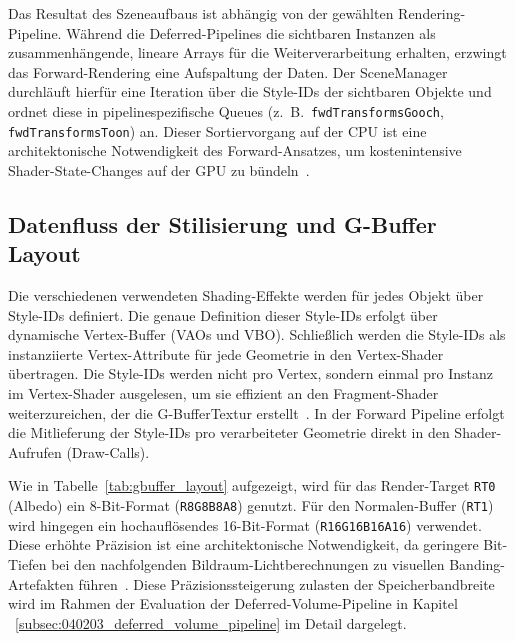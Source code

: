 Das Resultat des Szeneaufbaus ist abhängig von der gewählten Rendering-Pipeline.
Während die Deferred-Pipelines die sichtbaren Instanzen als zusammenhängende, lineare Arrays für die Weiterverarbeitung
erhalten, erzwingt das Forward-Rendering eine Aufspaltung der Daten.
Der SceneManager durchläuft hierfür eine Iteration über die Style-IDs der sichtbaren Objekte und ordnet diese in
pipelinespezifische Queues (z.\ B.\ \texttt{fwdTransformsGooch}, \texttt{fwdTransformsToon}) an.
Dieser Sortiervorgang auf der \ac{CPU} ist eine architektonische Notwendigkeit des Forward-Ansatzes, um
kostenintensive Shader-State-Changes auf der \ac{GPU} zu
bündeln~\parencite[vgl.][S.~795 u. S.~886]{akenine-mollerRealtimeRendering2019}.

\subsection{Datenfluss der Stilisierung und G-Buffer Layout}
\label{subsec:040103_g-buffer_layout}

Die verschiedenen verwendeten Shading-Effekte werden für jedes Objekt über Style-IDs definiert.
Die genaue Definition dieser Style-IDs erfolgt über dynamische Vertex-Buffer (\ac{VAO}s und \ac{VBO}).
Schließlich werden die Style-IDs als instanziierte Vertex-Attribute für jede Geometrie in den Vertex-Shader
übertragen.
Die Style-IDs werden nicht pro Vertex, sondern einmal pro Instanz im Vertex-Shader ausgelesen, um sie
effizient an den Fragment-Shader weiterzureichen, der die \ac{G-Buffer}Textur
erstellt~\parencite[vgl.][S.~797-798]{akenine-mollerRealtimeRendering2019}.
In der Forward Pipeline erfolgt die Mitlieferung der Style-IDs pro verarbeiteter Geometrie direkt in den
Shader-Aufrufen (Draw-Calls).

Wie in Tabelle~\ref{tab:gbuffer_layout} aufgezeigt, wird für das Render-Target \texttt{\ac{RT}0} (Albedo) ein
8-Bit-Format (\texttt{R8G8B8A8}) genutzt.
Für den Normalen-Buffer (\texttt{\ac{RT}1}) wird hingegen ein hochauflösendes 16-Bit-Format (\texttt{R16G16B16A16})
verwendet.
Diese erhöhte Präzision ist eine architektonische Notwendigkeit, da geringere Bit-Tiefen bei den nachfolgenden
Bildraum-Lichtberechnungen zu visuellen Banding-Artefakten führen~\parencite[vgl.][Folie~37]{AdvancesRealTimeRendering}.
Diese Präzisionssteigerung zulasten der Speicherbandbreite wird im Rahmen der Evaluation der
Deferred-Volume-Pipeline in Kapitel ~\ref{subsec:040203_deferred_volume_pipeline} im Detail dargelegt.


